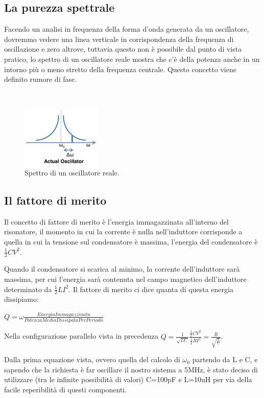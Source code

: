 \documentclass{article}
\begin{document}
\subsection{La purezza spettrale}
Facendo un analisi in frequenza della forma d'onda generata da un oscillatore, dovremmo vedere una linea verticale in corrispondenza della frequenza di oscillazione e zero altrove, tuttavia questo non è possibile dal punto di vista pratico, lo spettro di un oscillatore reale mostra che c'è della potenza anche in un intorno più o meno stretto della frequenza centrale.
Questo concetto viene definito rumore di fase.

~\begin{figure}[H]
\includegraphics[scale=1.5]{PhaseNoise.png} 
\centering
\caption{Spettro di un oscillatore reale.}
\label{fig:foo}
\end{figure}

\subsection{Il fattore di merito}
Il concetto di fattore di merito è l'energia immagazzinata all'interno del risonatore, il momento in cui la corrente è nulla nell'induttore corrisponde a quella in cui la tensione sul condensatore è massima, l'energia del condensatore è \Large$\frac{1}{2}CV^2$.\normalsize

Quando il condensatore si scarica al minimo, la corrente dell'induttore sarà massima, per cui l'energia sarà contenuta nel campo magnetico dell'induttore determinato da \Large$\frac{1}{2}LI^2$.\normalsize
Il fattore di merito ci dice quanta di questa energia dissipiamo:

\Large$Q=\omega\frac{EnergiaImmagazzinata}{PotenzaMediaDissipataPerPeriodo}$\normalsize
\centering

Nella configurazione parallelo vista in precedenza \Large$Q=\frac{1}{\sqrt{LC}}\frac{\frac{1}{2}CV^2}{\frac{1}{2}RI^2}=\frac{R}{\sqrt{\frac{L}{C}}}$.\normalsize

Dalla prima equazione vista, ovvero quella del calcolo di $\omega_0$ partendo da L e C, e sapendo che la richiesta è far oscillare il nostro sistema a 5MHz, è stato deciso di utilizzare (tra le infinite possibilità di valori) C=100pF e L=10uH per via della facile reperibilità di questi componenti.
\end{document}
